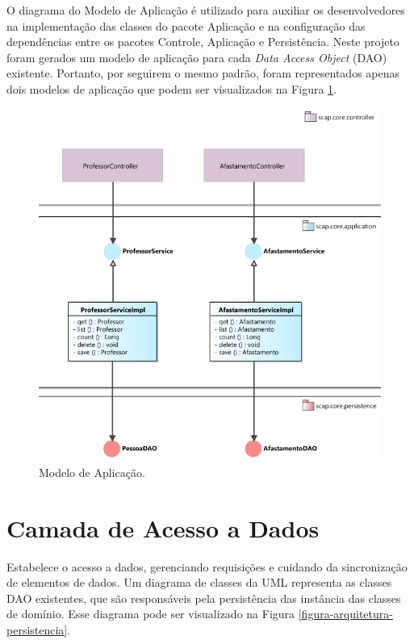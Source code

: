 O diagrama do Modelo de Aplicação é utilizado para auxiliar os desenvolvedores na implementação das classes do pacote Aplicação e na configuração das dependências entre os pacotes Controle, Aplicação e Persistência. Neste projeto foram gerados um modelo de aplicação para cada \textit{Data Access Object} (DAO) existente. Portanto, por seguirem o mesmo padrão, foram representados apenas dois modelos de aplicação que podem ser visualizados na Figura \ref{figura-arquitetura-aplicacao}. 

\begin{figure}[h]
	\centering
	\includegraphics[width=1\textwidth]{figuras/figura-arquitetura-aplicacao.png}
	\caption{Modelo de Aplicação.}
	\label{figura-arquitetura-aplicacao}
\end{figure}

\section{Camada de Acesso a Dados}
\label{sec-arquitetura-dados}


Estabelece o acesso a dados, gerenciando requisições e cuidando da sincronização de elementos de dados. Um diagrama de classes da UML representa as classes DAO existentes, que são responsáveis pela persistência das instância das classes de domínio. Esse diagrama pode ser visualizado na Figura \ref{figura-arquitetura-persistencia}.

